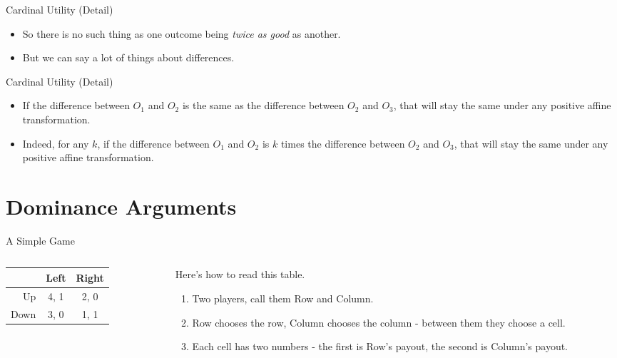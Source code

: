 \documentclass[
  14pt,
  letterpaper,
  ignorenonframetext,
  aspectratio=169,
  handout]{beamer}
\providecommand{\tightlist}{%
  \setlength{\itemsep}{0pt}\setlength{\parskip}{0pt}}\usepackage{longtable,booktabs,array}
\let\olditem\item
\renewcommand{\item}{%
\olditem\vspace{6pt}}
\begin{document}
\begin{frame}{Cardinal Utility (Detail)}
\protect\hypertarget{cardinal-utility-detail-2}{}
\begin{itemize}[<+->]
\tightlist
\item
  So there is no such thing as one outcome being \emph{twice as good} as
  another.
\item
  But we can say a lot of things about differences.
\end{itemize}
\end{frame}

\begin{frame}{Cardinal Utility (Detail)}
\protect\hypertarget{cardinal-utility-detail-3}{}
\begin{itemize}[<+->]
\tightlist
\item
  If the difference between \(O_1\) and \(O_2\) is the same as the
  difference between \(O_2\) and \(O_3\), that will stay the same under
  any positive affine transformation.
\item
  Indeed, for any \(k\), if the difference between \(O_1\) and \(O_2\)
  is \(k\) times the difference between \(O_2\) and \(O_3\), that will
  stay the same under any positive affine transformation.
\end{itemize}
\end{frame}

\hypertarget{dominance-arguments}{%
\section{Dominance Arguments}\label{dominance-arguments}}

\begin{frame}{A Simple Game}
\protect\hypertarget{a-simple-game}{}
\begin{columns}[T]
\begin{column}{0.4\textwidth}
\begin{table}[!h]
\centering
\begin{tabular}[t]{>{}r|cc}
\toprule
 & Left & Right\\
\midrule
Up & 4, 1 & 2, 0\\
Down & 3, 0 & 1, 1\\
\bottomrule
\end{tabular}
\end{table}
\end{column}

\begin{column}{0.6\textwidth}
Here's how to read this table.

\begin{enumerate}
\tightlist
\item
  Two players, call them Row and Column.
\item
  Row chooses the row, Column chooses the column - between them they
  choose a cell.
\item
  Each cell has two numbers - the first is Row's payout, the second is
  Column's payout.
\end{enumerate}
\end{column}
\end{columns}
\end{frame}
\end{document}
